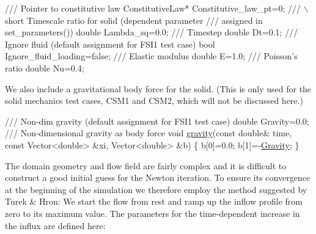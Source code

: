 \begin{DoxyCodeInclude}
\textcolor{comment}{ /// Pointer to constitutive law}
\textcolor{comment}{} ConstitutiveLaw* Constitutive\_law\_pt=0;
\textcolor{comment}{}
\textcolor{comment}{ /// \(\backslash\)short Timescale ratio for solid (dependent parameter}
\textcolor{comment}{ /// assigned in set\_parameters())}
\textcolor{comment}{} \textcolor{keywordtype}{double} Lambda\_sq=0.0;
\textcolor{comment}{}
\textcolor{comment}{ /// Timestep}
\textcolor{comment}{} \textcolor{keywordtype}{double} Dt=0.1;
\textcolor{comment}{}
\textcolor{comment}{ /// Ignore fluid (default assignment for FSI1 test case)}
\textcolor{comment}{} \textcolor{keywordtype}{bool} Ignore\_fluid\_loading=\textcolor{keyword}{false};
\textcolor{comment}{}
\textcolor{comment}{ /// Elastic modulus}
\textcolor{comment}{} \textcolor{keywordtype}{double} E=1.0;
\textcolor{comment}{}
\textcolor{comment}{ /// Poisson's ratio}
\textcolor{comment}{} \textcolor{keywordtype}{double} Nu=0.4; 

\end{DoxyCodeInclude}


We also include a gravitational body force for the solid. (This is only used for the solid mechanics test cases, C\+S\+M1 and C\+S\+M2, which will not be discussed here.)


\begin{DoxyCodeInclude}
\textcolor{comment}{}
\textcolor{comment}{ /// Non-dim gravity (default assignment for FSI1 test case)}
\textcolor{comment}{} \textcolor{keywordtype}{double} Gravity=0.0; 
\textcolor{comment}{}
\textcolor{comment}{ /// Non-dimensional gravity as body force}
\textcolor{comment}{} \textcolor{keywordtype}{void} \hyperlink{namespaceGlobal__Parameters_a200109847bf4cc26da4d00e8d68d569e}{gravity}(\textcolor{keyword}{const} \textcolor{keywordtype}{double}& time, 
              \textcolor{keyword}{const} Vector<double> &xi,
              Vector<double> &b)
 \{
  b[0]=0.0;
  b[1]=-\hyperlink{namespaceGlobal__Parameters_a335000b5db4206486a116ae0468d2d0c}{Gravity};
 \}

\end{DoxyCodeInclude}


The domain geometry and flow field are fairly complex and it is difficult to construct a good initial guess for the Newton iteration. To ensure its convergence at the beginning of the simulation we therefore employ the method suggested by Turek \& Hron\+: We start the flow from rest and ramp up the inflow profile from zero to its maximum value. The parameters for the time-\/dependent increase in the influx are defined here\+:


